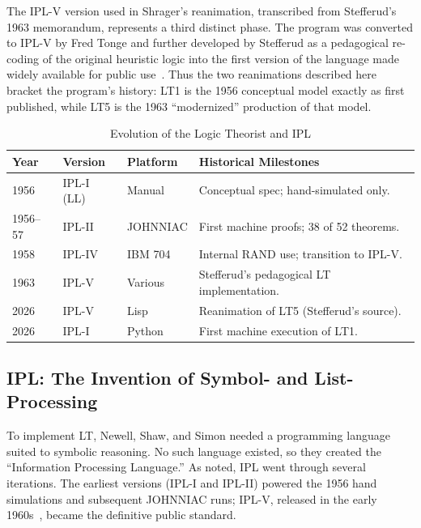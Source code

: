\documentclass[journal]{IEEEtran}
\begin{document}
The IPL-V version used in Shrager's reanimation, transcribed from
Stefferud's 1963 memorandum, represents a third distinct phase. The
program was converted to IPL-V by Fred Tonge and further developed by
Stefferud as a pedagogical re-coding of the original heuristic logic
into the first version of the language made widely available for
public use~\cite{stefferud1963lt}. Thus the two reanimations described
here bracket the program's history: LT1 is the 1956 conceptual model
exactly as first published, while LT5 is the 1963 ``modernized''
production of that model.

\begin{table}[h]
\centering
\caption{Evolution of the Logic Theorist and IPL}
\label{tab:lt_versions}
\begin{tabular}{@{}llll@{}}
\toprule
\textbf{Year} & \textbf{Version} & \textbf{Platform} & \textbf{Historical Milestones} \\ \midrule
1956 & IPL-I (LL) & Manual & Conceptual spec; hand-simulated only. \\
1956--57 & IPL-II & JOHNNIAC & First machine proofs; 38 of 52 theorems. \\
1958 & IPL-IV & IBM 704 & Internal RAND use; transition to IPL-V. \\
1963 & IPL-V & Various & Stefferud's pedagogical LT implementation. \\
2026 & IPL-V & Lisp & Reanimation of LT5 (Stefferud's source). \\
2026 & IPL-I & Python & First machine execution of LT1. \\ \bottomrule
\end{tabular}
\end{table}

\subsection{IPL: The Invention of Symbol- and List-Processing}

To implement LT, Newell, Shaw, and Simon needed a programming language
suited to symbolic reasoning. No such language existed, so they
created the ``Information Processing Language.'' As noted, IPL went
through several iterations. The earliest versions (IPL-I and IPL-II)
powered the 1956 hand simulations and subsequent JOHNNIAC runs;
IPL-V, released in the early 1960s~\cite{newell1964ipl}, became the
definitive public standard.
\end{document}
